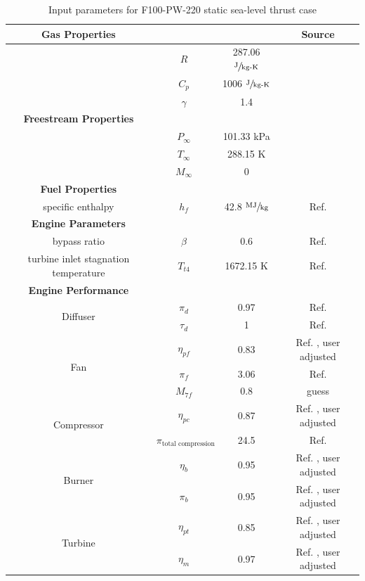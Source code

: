 \documentclass{article}
\begin{document}
\begin{table}
\caption{Input parameters for F100-PW-220 static sea-level thrust case}
\label{tab:input_parameters}
\begin{center}
\begin{tabular}{c | c | c | c}
\hline \textbf{Gas Properties} & & & Source \\ \hline
& $R$ & 287.06 $\sfrac{\textrm{J}}{\textrm{kg-K}}$ & \\
& $C_p$ & 1006 $\sfrac{\textrm{J}}{\textrm{kg-K}}$ & \\
& $\gamma$ & 1.4 & \\
\hline \textbf{Freestream Properties} & & & \\ \hline
& $P_{\infty}$ & 101.33 kPa  & \\
& $T_{\infty}$ & 288.15 K  &  \\
& $M_{\infty}$ & 0  &  \\
\hline \textbf{Fuel Properties} & &   & \\ \hline
specific enthalpy & $h_f$ & 42.8 $\sfrac{\textrm{MJ}}{\textrm{kg}}$  & Ref. \cite{cantwell283}\\
\hline \textbf{Engine Parameters} & & & \\ \hline
bypass ratio & $\beta$ & 0.6 & Ref. \cite{ihsengine}\\
turbine inlet stagnation temperature & $T_{t4}$ & 1672.15 K  & Ref. \cite{ihsengine}\\
\hline \textbf{Engine Performance} & & & \\ \hline
\multirow{2}{*}{Diffuser} & $\pi_d$ & 0.97 & Ref. \cite{Lee2009} \\ & $\tau_d$ & 1 & Ref. \cite{Lee2009}\\ \hline
\multirow{3}{*}{Fan} & $\eta_{pf}$ & 0.83 & Ref. \cite{Lee2009}, user adjusted \\ & $\pi_f$ & 3.06 & Ref. \cite{ihsengine}\\  & $M_{7f}$ & 0.8 & guess \\  \hline
\multirow{2}{*}{Compressor} & $\eta_{pc}$ & 0.87 & Ref. \cite{Lee2009}, user adjusted \\ & $\pi_{\textrm{total compression}}$ & 24.5 & Ref. \cite{ihsengine}\\ \hline
\multirow{2}{*}{Burner} & $\eta_{b}$ & 0.95 & Ref. \cite{Lee2009}, user adjusted \\ & $\pi_{b}$ & 0.95 & Ref. \cite{ihsengine}, user adjusted \\ \hline
\multirow{2}{*}{Turbine} & $\eta_{pt}$ & 0.85 & Ref. \cite{Lee2009}, user adjusted \\ & $\eta_m$ & 0.97 & Ref. \cite{cantwell283}, user adjusted \\ \hline

\end{tabular}
\end{center}
\end{table}
\end{document}
